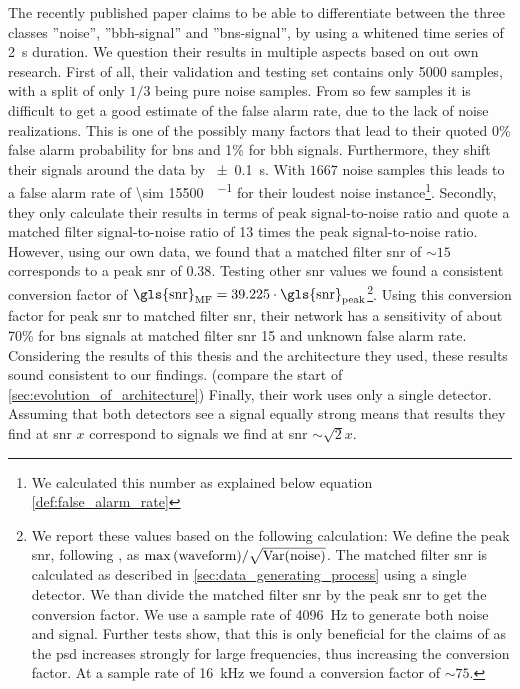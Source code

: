 The recently published paper \cite{bns_network} claims to be able to differentiate between the three classes ''noise'', ''\gls{bbh}-signal'' and ''\gls{bns}-signal'', by using a whitened time series of \SI{2}{\s} duration. We question their results in multiple aspects based on out own research. First of all, their validation and testing set contains only 5000 samples, with a split of only $1/3$ being pure noise samples. From so few samples it is difficult to get a good estimate of the false alarm rate, due to the lack of noise realizations. This is one of the possibly many factors that lead to their quoted 0\% false alarm probability for \gls{bns} and 1\% for \gls{bbh} signals. Furthermore, they shift their signals around the data by \SI{\pm 0.1}{\s}. With $1667$ noise samples this leads to a false alarm rate of \SI[per-mode=fraction]{\sim 15500}{\samples\per\month} for their loudest noise instance\footnote{We calculated this number as explained below equation \eqref{def:false_alarm_rate}}. Secondly, they only calculate their results in terms of peak signal-to-noise ratio and quote a matched filter signal-to-noise ratio of 13 times the peak signal-to-noise ratio. However, using our own data, we found that a matched filter \gls{snr} of $\sim 15$ corresponds to a peak \gls{snr} of $0.38$. Testing other \gls{snr} values we found a consistent conversion factor of $\text{\gls{snr}}_\text{MF} = 39.225\cdot\text{\gls{snr}}_\text{peak}$\footnote{We report these values based on the following calculation: We define the peak \gls{snr}, following \cite{bns_network}, as $\max{\left( \text{waveform} \right)} / \sqrt{\text{Var}{\left( \text{noise} \right)}}$. The matched filter \gls{snr} is calculated as described in \autoref{sec:data_generating_process} using a single detector. We than divide the matched filter \gls{snr} by the peak \gls{snr} to get the conversion factor. We use a sample rate of \SI{4096}{\hertz} to generate both noise and signal. Further tests show, that this is only beneficial for the claims of \cite{bns_network} as the \gls{psd} increases strongly for large frequencies, thus increasing the conversion factor. At a sample rate of \SI{16}{\kilo\hertz} we found a conversion factor of $\sim 75$.}. Using this conversion factor for peak \gls{snr} to matched filter \gls{snr}, their network has a sensitivity of about 70\% for \gls{bns} signals at matched filter \gls{snr} 15 and unknown false alarm rate. Considering the results of this thesis and the architecture they used, these results sound consistent to our findings. (compare the start of \autoref{sec:evolution_of_architecture}) Finally, their work uses only a single detector. Assuming that both detectors see a signal equally strong means that results they find at \gls{snr} $x$ correspond to signals we find at \gls{snr} $\sim \sqrt{2}x$.\smallskip\\
